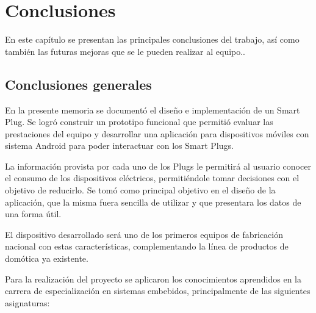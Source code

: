 
\chapter{Conclusiones} %

\label{Chapter5} %

En este capítulo se presentan las principales conclusiones del trabajo, así como también las futuras mejoras que se le pueden realizar al equipo..


\section{Conclusiones generales}

En la presente memoria se documentó el diseño e implementación de un Smart Plug. Se logró construir un prototipo funcional que permitió evaluar las prestaciones del equipo y desarrollar una aplicación para dispositivos móviles con sistema Android para poder interactuar con los Smart Plugs. 

La información provista por cada uno de los Plugs le permitirá al usuario conocer el consumo de los dispositivos eléctricos, permitiéndole tomar decisiones con el objetivo de reducirlo. Se tomó como principal objetivo en el diseño de la aplicación, que la misma fuera sencilla de utilizar y que presentara los datos de una forma útil.

El dispositivo desarrollado será uno de los primeros equipos de fabricación nacional con estas características, complementando la línea de productos de domótica ya existente.

Para la realización del proyecto se aplicaron los conocimientos aprendidos en la carrera de especialización en sistemas embebidos, principalmente de las siguientes asignaturas:

